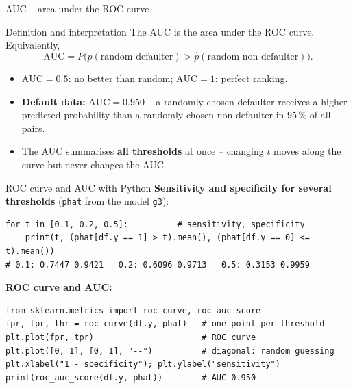 \documentclass[aspectratio=169,11pt]{beamer}
\begin{document}
\begin{frame}{AUC -- area under the ROC curve}
  \begin{block}{Definition and interpretation}
    The AUC is the area under the ROC curve. Equivalently,
    \[
      \text{AUC}=P\bigl(\hat p(\text{random defaulter})>\hat p(\text{random non-defaulter})\bigr).
    \]
  \end{block}
  \begin{itemize}\setlength{\itemsep}{3pt}
    \item $\text{AUC}=0.5$: no better than random; $\text{AUC}=1$: perfect
          ranking.
    \item \textbf{Default data:} $\text{AUC}=0.950$ -- a randomly chosen
          defaulter receives a higher predicted probability than a randomly
          chosen non-defaulter in $95\,\%$ of all pairs.
    \item The AUC summarises \textbf{all thresholds} at once -- changing $t$
          moves along the curve but never changes the AUC.
  \end{itemize}
\end{frame}

\begin{frame}[fragile]{ROC curve and AUC with Python}
  \textbf{Sensitivity and specificity for several thresholds}
  (\texttt{phat} from the model \texttt{g3}):
\begin{lstlisting}
for t in [0.1, 0.2, 0.5]:          # sensitivity, specificity
    print(t, (phat[df.y == 1] > t).mean(), (phat[df.y == 0] <= t).mean())
# 0.1: 0.7447 0.9421   0.2: 0.6096 0.9713   0.5: 0.3153 0.9959
\end{lstlisting}
  \textbf{ROC curve and AUC:}
\begin{lstlisting}
from sklearn.metrics import roc_curve, roc_auc_score
fpr, tpr, thr = roc_curve(df.y, phat)   # one point per threshold
plt.plot(fpr, tpr)                      # ROC curve
plt.plot([0, 1], [0, 1], "--")          # diagonal: random guessing
plt.xlabel("1 - specificity"); plt.ylabel("sensitivity")
print(roc_auc_score(df.y, phat))        # AUC 0.950
\end{lstlisting}
\end{frame}
\end{document}
